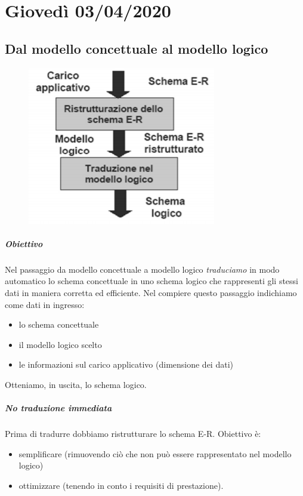 \chapter{Giovedì 03/04/2020}

\section{Dal modello concettuale al modello logico}
\begin{figure}
	\includegraphics[width=0.9\linewidth]{images/99.PNG} 
	\vspace*{-30pt}
\end{figure}

\paragraph{Obiettivo} Nel passaggio da modello concettuale a modello logico \emph{traduciamo} in modo automatico lo schema concettuale in uno schema logico che rappresenti gli stessi dati in maniera corretta ed efficiente. Nel compiere questo passaggio indichiamo come dati in ingresso:
\begin{itemize}
	\item lo schema concettuale
	\item il modello logico scelto
	\item le informazioni sul carico applicativo (dimensione dei dati)
\end{itemize}
Otteniamo, in uscita, lo schema logico.
\paragraph{No traduzione immediata} Prima di tradurre dobbiamo ristrutturare lo schema E-R. Obiettivo è:
\begin{itemize}
	\item semplificare (rimuovendo ciò che non può essere rappresentato nel modello logico) 
	\item ottimizzare (tenendo in conto i requisiti di prestazione).
\end{itemize}

